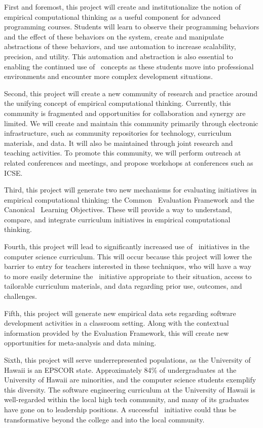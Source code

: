 First and foremost, this project will create and institutionalize the
notion of empirical computational thinking as a useful component for
advanced programming courses.  Students will learn to observe their programming
behaviors and the effect of these behaviors on the system, create and
manipulate abstractions of these behaviors, and use automation to increase
scalability, precision, and utility.  This automation and abstraction is also
essential to enabling the continued use of \eCT\ concepts as these students
move into professional environments and encounter more complex development
situations.

Second, this project will create a new community of research and practice
around the unifying concept of empirical computational thinking.
Currently, this community is fragmented and opportunities for collaboration
and synergy are limited.  We will create and maintain this community
primarily through electronic infrastructure, such as community repositories
for technology, curriculum materials, and data.  It will also be maintained
through joint research and teaching activities.  To promote this community,
we will perform outreach at related conferences and meetings, and propose
workshops at conferences such as ICSE.

Third, this project will generate two new mechanisms for evaluating
initiatives in empirical computational thinking: the Common \eCT\
Evaluation Framework and the Canonical \eCT\ Learning Objectives.  These
will provide a way to understand, compare, and integrate curriculum
initiatives in empirical computational thinking.

Fourth, this project will lead to significantly increased use of \eCT\
initiatives in the computer science curriculum.  This will occur because this
project will lower the barrier to entry for teachers interested in
these techniques, who will have a way to more easily determine the \eCT\
initiative appropriate to their situation, access to tailorable curriculum
materials, and data regarding prior use, outcomes, and challenges.

Fifth, this project will generate new empirical data sets regarding
software development activities in a classroom setting.  Along with the
contextual information provided by the Evaluation Framework, this will
create new opportunities for meta-analysis and data mining.  

Sixth, this project will serve underrepresented populations, as the
University of Hawaii is an EPSCOR state. Approximately 84\% of
undergraduates at the University of Hawaii are minorities, and the computer
science students exemplify this diversity.  The software engineering
curriculum at the University of Hawaii is well-regarded within the local
high tech community, and many of its graduates have gone on to leadership
positions. A successful \eCT\ initiative could thus be transformative
beyond the college and into the local community.

